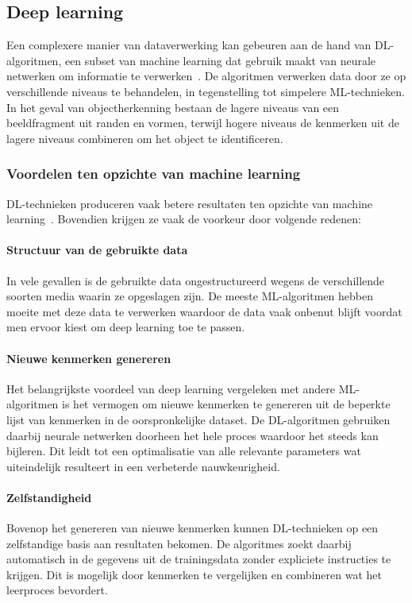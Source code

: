 \subsection{Deep learning}
\label{subsec:deep-learning-algoritmen}
Een complexere manier van dataverwerking kan gebeuren aan de hand van DL-algoritmen, een subset van machine learning dat gebruik maakt van neurale netwerken om informatie te verwerken~\autocite{Bozic2024}.
De algoritmen verwerken data door ze op verschillende niveaus te behandelen, in tegenstelling tot simpelere ML-technieken.
In het geval van objectherkenning bestaan de lagere niveaus van een beeldfragment uit randen en vormen, terwijl hogere niveaus de kenmerken uit de lagere niveaus combineren om het object te identificeren.

\subsubsection{Voordelen ten opzichte van machine learning}
DL-technieken produceren vaak betere resultaten ten opzichte van machine learning~\autocite{Ahmed2023}.
Bovendien krijgen ze vaak de voorkeur door volgende redenen:

\paragraph{Structuur van de gebruikte data}
In vele gevallen is de gebruikte data ongestructureerd wegens de verschillende soorten media waarin ze opgeslagen zijn.
De meeste ML-algoritmen hebben moeite met deze data te verwerken waardoor de data vaak onbenut blijft voordat men ervoor kiest om deep learning toe te passen.

\paragraph{Nieuwe kenmerken genereren}
Het belangrijkste voordeel van deep learning vergeleken met andere ML-algoritmen is het vermogen om nieuwe kenmerken te genereren uit de beperkte lijst van kenmerken in de oorspronkelijke dataset.
De DL-algoritmen gebruiken daarbij neurale netwerken doorheen het hele proces waardoor het steeds kan bijleren.
Dit leidt tot een optimalisatie van alle relevante parameters wat uiteindelijk resulteert in een verbeterde nauwkeurigheid.

\paragraph{Zelfstandigheid}
Bovenop het genereren van nieuwe kenmerken kunnen DL-technieken op een zelfstandige basis aan resultaten bekomen.
De algoritmes zoekt daarbij automatisch in de gegevens uit de trainingsdata zonder expliciete instructies te krijgen.
Dit is mogelijk door kenmerken te vergelijken en combineren wat het leerproces bevordert.


